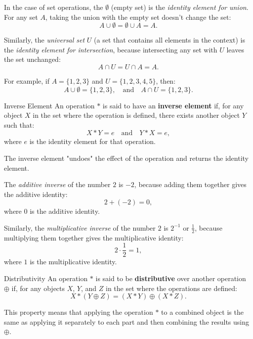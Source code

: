 \begin{example}
    In the case of set operations, the \(\emptyset\) (empty set) is the \textit{identity element for union}. For any set \( A \), taking the union with the empty set doesn’t change the set:
    \[
    A \cup \emptyset = \emptyset \cup A = A.
    \]
    
    Similarly, the \textit{universal set} \( U \) (a set that contains all elements in the context) is the \textit{identity element for intersection}, because intersecting any set with \( U \) leaves the set unchanged:
    \[
    A \cap U = U \cap A = A.
    \]
    
    For example, if \( A = \{1, 2, 3\} \) and \( U = \{1, 2, 3, 4, 5\} \), then:
    \[
    A \cup \emptyset = \{1, 2, 3\}, \quad \text{and} \quad A \cap U = \{1, 2, 3\}.
    \]
\end{example}        

\begin{definitionbox}{Inverse Element}
    An operation \( * \) is said to have an \textbf{inverse element} if, for any object \( X \) in the set where the operation is defined, there exists another object \( Y \) such that:
    \[
    X * Y = e \quad \text{and} \quad Y * X = e,
    \]
    where \( e \) is the identity element for that operation.
    
    The inverse element "undoes" the effect of the operation and returns the identity element.
\end{definitionbox}

\begin{example}
    The \textit{additive inverse} of the number \( 2 \) is \( -2 \), because adding them together gives the additive identity:
    \[
    2 + (-2) = 0,
    \]
    where \( 0 \) is the additive identity.
    
    Similarly, the \textit{multiplicative inverse} of the number \( 2 \) is \( 2^{-1} \) or \( \frac{1}{2} \), because multiplying them together gives the multiplicative identity:
    \[
    2 \cdot \frac{1}{2} = 1,
    \]
    where \( 1 \) is the multiplicative identity.
\end{example}    

\begin{definitionbox}{Distributivity}
    An operation \( * \) is said to be \textbf{distributive} over another operation \( \oplus \) if, for any objects \( X \), \( Y \), and \( Z \) in the set where the operations are defined:
    \[
    X * (Y \oplus Z) = (X * Y) \oplus (X * Z).
    \]
    
    This property means that applying the operation \( * \) to a combined object is the same as applying it separately to each part and then combining the results using \( \oplus \).
\end{definitionbox}

